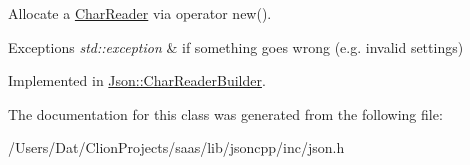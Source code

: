 Allocate a \hyperlink{class_json_1_1_char_reader}{Char\+Reader} via operator new(). 


\begin{DoxyExceptions}{Exceptions}
{\em std\+::exception} & if something goes wrong (e.\+g. invalid settings) \\
\hline
\end{DoxyExceptions}


Implemented in \hyperlink{class_json_1_1_char_reader_builder_a29e41475c2b40a9ab3da10e7c09f6bfd}{Json\+::\+Char\+Reader\+Builder}.



The documentation for this class was generated from the following file\+:\begin{DoxyCompactItemize}
\item 
/\+Users/\+Dat/\+Clion\+Projects/saas/lib/jsoncpp/inc/json.\+h\end{DoxyCompactItemize}
